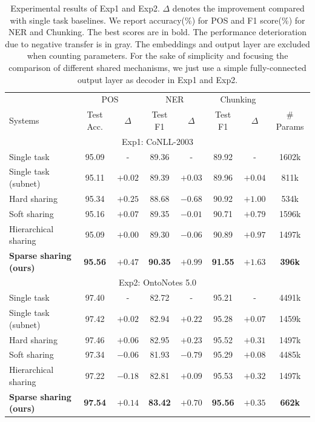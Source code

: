 \documentclass[letterpaper]{article} %
\begin{document}
\begin{table}[tbp]
\centering
\begin{tabular}{lccccccc}
\toprule
& \multicolumn{2}{c}{POS} & \multicolumn{2}{c}{NER} & \multicolumn{2}{c}{Chunking} &  \\
\multirow{-2}{*}{Systems} & Test Acc. & $\Delta$ & Test F1 & $\Delta$ & Test F1 & $\Delta$ & \multirow{-2}{*}{\# Params} \\ \midrule[.5pt]
\multicolumn{8}{c}{Exp1: CoNLL-2003} \\ \midrule[.5pt]
Single task & 95.09 & - & 89.36 & - & 89.92 & - & 1602k \\
Single task (subnet) & 95.11 & $+0.02$ & 89.39 & $+0.03$ & 89.96 & $+0.04$ & 811k \\
Hard sharing & 95.34 & $+0.25$ & 88.68 & {\cellcolor[HTML]{D6D6D6} $-0.68$} & 90.92 & $+1.00$ & 534k \\
Soft sharing & 95.16 & $+0.07$ & 89.35 & {\cellcolor[HTML]{D6D6D6} $-0.01$} & 90.71 & $+0.79$ & 1596k \\
Hierarchical sharing & 95.09 & $+0.00$ & 89.30 & {\cellcolor[HTML]{D6D6D6} $-0.06$} & 90.89 & $+0.97$ & 1497k \\
\textbf{Sparse sharing (ours)} & \textbf{95.56} & $+0.47$ & \textbf{90.35} & $+0.99$ & \textbf{91.55} & $+1.63$ & \textbf{396k} \\ \midrule[.5pt]
\multicolumn{8}{c}{Exp2: OntoNotes 5.0} \\ \midrule[.5pt]
Single task & 97.40 & - & 82.72 & - & 95.21 & - & 4491k \\
Single task (subnet) & 97.42 & $+0.02$ & 82.94 & $+0.22$ & 95.28 & $+0.07$ & 1459k \\
Hard sharing & 97.46 & $+0.06$ & 82.95 & $+0.23$ & 95.52 & $+0.31$ & 1497k \\
Soft sharing & 97.34 & {\cellcolor[HTML]{D6D6D6} $-0.06$} & 81.93 & {\cellcolor[HTML]{D6D6D6} $-0.79$} & 95.29 & $+0.08$ & 4485k \\
Hierarchical sharing & 97.22 & {\cellcolor[HTML]{D6D6D6} $-0.18$} & 82.81 & $+0.09$ & 95.53 & $+0.32$ & 1497k \\
\textbf{Sparse sharing (ours)} & \textbf{97.54} & $+0.14$ & \textbf{83.42} & $+0.70$ & \textbf{95.56} & $+0.35$ & \textbf{662k} \\ \bottomrule
\end{tabular}
\caption{Experimental results of Exp1 and Exp2. $\Delta$ denotes the improvement compared with single task baselines. We report accuracy(\%) for POS and F1 score(\%) for NER and Chunking. The best scores are in bold. The performance deterioration due to negative transfer is in gray. The embeddings and output layer are excluded when counting parameters. For the sake of simplicity and focusing the comparison of different shared mechanisms, we just use a simple fully-connected output layer as decoder in Exp1 and Exp2.
}
\label{tb:main_results}
\end{table}
\end{document}
